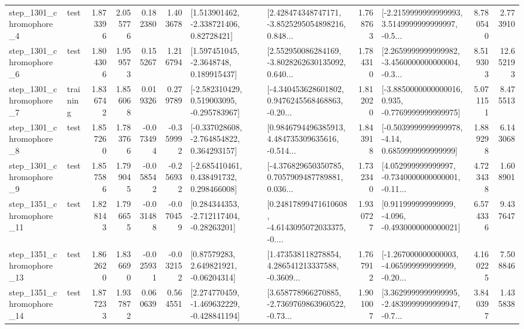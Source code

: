 \begin{tabular}{llrrrrllrlrr}
  step\_1301\_chromophore\_4 &      test &      1.873396 &    2.055776 &      0.182380 &  1.403678 &     [1.513901462, -2.338721406, 0.82728421] &  [2.428474348747171, -3.8525295054898216, 0.848... &       1.768763 &  [-2.2159999999999993, 3.5149999999999997, -0.5... &            8.780540 &          2.773910 \\
  step\_1301\_chromophore\_6 &      test &      1.804306 &    1.959573 &      0.155267 &  1.216794 &      [1.597451045, -2.3648748, 0.189915437] &  [2.552950086284169, -3.8028262630135092, 0.640... &       1.784310 &  [2.2659999999999982, -3.4560000000000004, -0.3... &            8.519303 &         12.652193 \\
  step\_1301\_chromophore\_7 &  training &      1.836742 &    1.856068 &      0.019326 &  0.279789 &   [-2.582310429, 0.519003095, -0.295783967] &  [-4.340453628601802, 0.9476245568468863, -0.20... &       1.812020 &  [-3.8850000000000016, 0.935, -0.7769999999999975] &            5.071151 &          8.475513 \\
  step\_1301\_chromophore\_8 &      test &      1.857260 &    1.783766 &     -0.073494 & -0.359992 &   [-0.337028608, -2.764854822, 0.364293157] &  [0.9846794496385913, 4.484735309635616, -0.514... &       1.843918 &   [-0.5039999999999978, -4.14, 0.6859999999999999] &            1.889298 &          6.143068 \\
  step\_1301\_chromophore\_9 &      test &      1.857586 &    1.799045 &     -0.058542 & -0.256932 &    [-2.685410461, 0.438491732, 0.298466008] &  [-4.376829650350785, 0.7057909487789881, 0.036... &       1.732340 &  [4.052999999999997, -0.7340000000000001, -0.11... &            4.723438 &          1.608901 \\
 step\_1351\_chromophore\_11 &      test &      1.828143 &    1.796655 &     -0.031488 & -0.070459 &    [0.284344353, -2.712117404, -0.28263201] &  [0.24817899471610608, -4.6143095072033375, -0.... &       1.930727 &   [0.911999999999999, -4.096, -0.4930000000000021] &            6.574336 &          9.437647 \\
 step\_1351\_chromophore\_13 &      test &      1.862620 &    1.836690 &     -0.025931 & -0.032152 &      [0.87579283, 2.649821921, -0.06204314] &  [1.473538118278854, 4.286541213337588, -0.3609... &       1.767912 &  [-1.267000000000003, -4.065999999999999, -0.20... &            4.160225 &          7.508846 \\
 step\_1351\_chromophore\_14 &      test &      1.877233 &    1.937872 &      0.060639 &  0.564551 &   [2.274770459, -1.469632229, -0.428841194] &  [3.658778966270885, -2.7369769863960522, -0.73... &       1.901007 &  [3.3629999999999995, -2.4839999999999947, -0.7... &            3.840397 &          1.435838 \\

\end{tabular}

